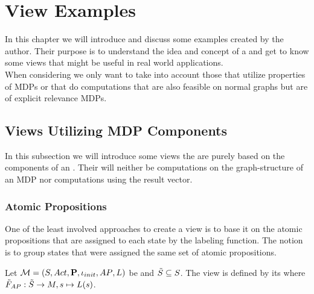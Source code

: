\documentclass[preview]{standalone}
\begin{document}
 
\section{View Examples} \label{ch:viewexmp}
In this chapter we will introduce and discuss some \viewN examples created by the author. Their purpose is to understand the idea and concept of a \viewN and get to know some views that might be useful in real world applications. \\
When considering \viewsN we only want to take into account those that utilize properties of MDPs or that do computations that are also feasible on normal graphs but are of explicit relevance MDPs.
\subsection{Views Utilizing MDP Components}
In this subsection we will introduce some views the are purely based on the components of an \mdpN. Their will neither be computations on the graph-structure of an MDP nor computations using the result vector.
\subsubsection{Atomic Propositions}
One of the least involved approaches to create a view is to base it on the atomic propositions that are assigned to each state by the labeling function. The notion is to group states that were assigned the same set of atomic propositions. 


%		
%		


\begin{definition}	
	Let ${{{\mathcal{M}}}} = {{({S}, {Act}, {\textbf{P}}, {\iota_{init}}, {AP}, {L})}}$ be \achgphN and ${\tilde{{S}}} \subseteq {S}$. The view \viewatomicprops is defined by its \grpfctN \gfctatomicprops where $\gfctsubatomicprops : \smstates \to \imggrp, {\state}\mapsto{\labelingfct(\state)}$.
\end{definition}
\end{document}
